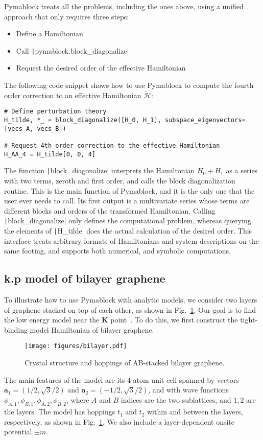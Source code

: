 Pymablock treats all the problems, including the ones above, using a unified
approach that only requires three steps:
%
\begin{itemize}
\item Define a Hamiltonian
\item Call \texttt|pymablock.block_diagonalize|
\item Request the desired order of the effective Hamiltonian
\end{itemize}
%
The following code snippet shows how to use Pymablock to compute the fourth
order correction to an effective Hamiltonian $\tilde{\mathcal{H}}$:
%
\begin{verbatim}
# Define perturbation theory
H_tilde, *_ = block_diagonalize([H_0, H_1], subspace_eigenvectors=[vecs_A, vecs_B])

# Request 4th order correction to the effective Hamiltonian
H_AA_4 = H_tilde[0, 0, 4]
\end{verbatim}
%
The function \texttt|block_diagonalize| interprets the Hamiltonian
$H_0 + H_1$ as a series with two terms, zeroth and first order, and calls the
block diagonalization routine.
This is the main function of Pymablock, and it is the only one that the user
ever needs to call.
Its first output is a multivariate series whose terms are different blocks and
orders of the transformed Hamiltonian.
Calling \texttt|block_diagonalize| only defines the computational
problem, whereas querying the elements of \texttt|H_tilde|
does the actual calculation of the desired order.
This interface treats arbitrary formats of Hamiltonians and system descriptions
on the same footing, and supports both numerical, and symbolic computations.

\subsection{k.p model of bilayer graphene}


To illustrate how to use Pymablock with analytic models, we consider two layers
of graphene stacked on top of each other, as shown in Fig.~\ref{fig:bilayer}.
Our goal is to find the low energy model near the $\mathbf{K}$ point~\cite{McCann_2013}.
To do this, we first construct the tight-binding model Hamiltonian of bilayer
graphene.
%
\begin{figure}[!htbp]
\centering
\texttt{[image: figures/bilayer.pdf]}
\caption[]{Crystal structure and hoppings of AB-stacked bilayer graphene.}
\label{fig:bilayer}
\end{figure}
%
The main features of the model are its 4-atom unit cell spanned by vectors
$\mathbf{a}_1 = (1/2, \sqrt{3}/2)$ and $\mathbf{a}_2=( -1/2, \sqrt{3}/2)$,
and with wave functions $\phi_{A,1}, \phi_{B,1}, \phi_{A,2}, \phi_{B,2}$, where
$A$ and $B$ indices are the two sublattices, and $1,2$ are the layers.
The model has hoppings $t_1$ and $t_2$ within and between the layers,
respectively, as shown in Fig.~\ref{fig:bilayer}.
We also include a layer-dependent onsite potential $\pm m$.

